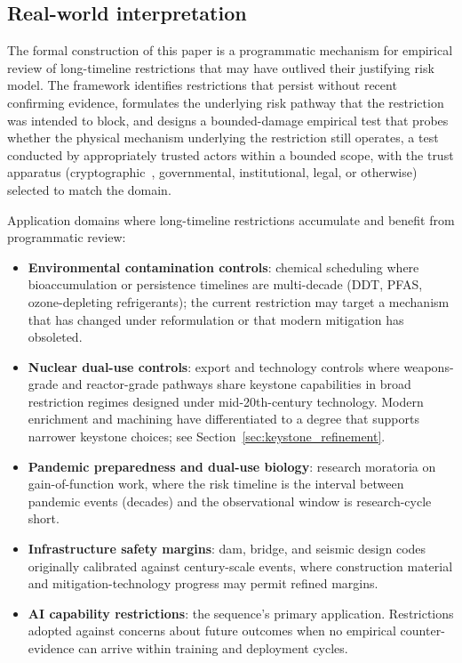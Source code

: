 \subsection{Real-world interpretation}
\label{sec:real_world}

The formal construction of this paper is a programmatic mechanism
for empirical review of long-timeline restrictions that may have
outlived their justifying risk model.  The framework identifies
restrictions that persist without recent confirming evidence,
formulates the underlying risk pathway that the restriction was
intended to block, and designs a bounded-damage empirical test that
probes whether the physical mechanism underlying the restriction
still operates, a test conducted by appropriately trusted actors
within a bounded scope, with the trust apparatus
(cryptographic~\citep{lasser2026exo}, governmental, institutional,
legal, or otherwise) selected to match the domain.

Application domains where long-timeline restrictions accumulate
and benefit from programmatic review:

\begin{itemize}
\item \textbf{Environmental contamination controls}: chemical
  scheduling where bioaccumulation or persistence timelines are
  multi-decade (DDT, PFAS, ozone-depleting refrigerants); the
  current restriction may target a mechanism that has changed
  under reformulation or that modern mitigation has obsoleted.
\item \textbf{Nuclear dual-use controls}: export and technology
  controls where weapons-grade and reactor-grade pathways share
  keystone capabilities in broad restriction regimes designed
  under mid-20th-century technology.  Modern enrichment and
  machining have differentiated to a degree that supports
  narrower keystone choices; see
  Section~\ref{sec:keystone_refinement}.
\item \textbf{Pandemic preparedness and dual-use biology}:
  research moratoria on gain-of-function work, where the risk
  timeline is the interval between pandemic events (decades)
  and the observational window is research-cycle short.
\item \textbf{Infrastructure safety margins}: dam, bridge, and
  seismic design codes originally calibrated against
  century-scale events, where construction material and
  mitigation-technology progress may permit refined margins.
\item \textbf{AI capability restrictions}: the sequence's
  primary application.  Restrictions adopted against
  concerns about future outcomes when no empirical
  counter-evidence can arrive within training and deployment
  cycles.
\end{itemize}

